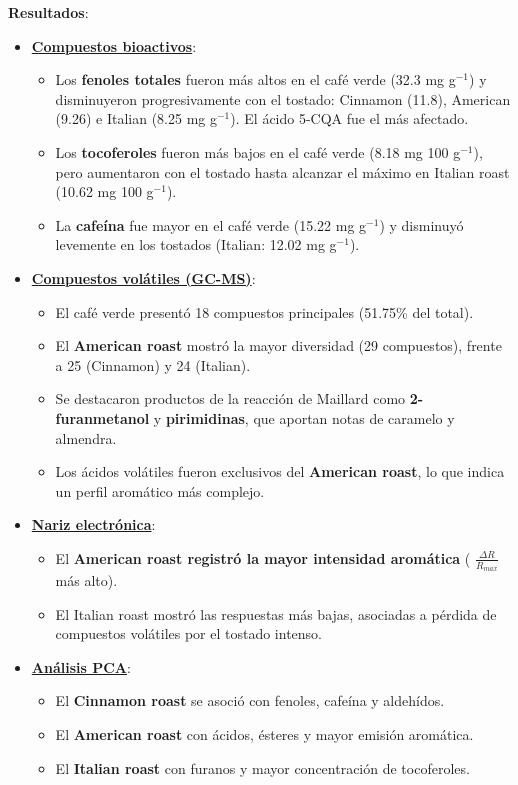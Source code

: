 \documentclass{article}
\begin{document}
\textbf{Resultados}:  
\begin{itemize}
	\item \underline{\textbf{Compuestos bioactivos}}: 
	\begin{itemize}
		\item Los \textbf{fenoles totales} fueron más altos en el café verde (32.3 mg g$^{-1}$) y disminuyeron progresivamente con el tostado: Cinnamon (11.8), American (9.26) e Italian (8.25 mg g$^{-1}$). El ácido 5-CQA fue el más afectado.  
		\item Los \textbf{tocoferoles} fueron más bajos en el café verde (8.18 mg 100 g$^{-1}$), pero aumentaron con el tostado hasta alcanzar el máximo en Italian roast (10.62 mg 100 g$^{-1}$).  
		\item La \textbf{cafeína} fue mayor en el café verde (15.22 mg g$^{-1}$) y disminuyó levemente en los tostados (Italian: 12.02 mg g$^{-1}$).  
	\end{itemize}
	\item \underline{\textbf{Compuestos volátiles (GC-MS)}}: 
	\begin{itemize}
		\item El café verde presentó 18 compuestos principales (51.75\% del total).  
		\item El \textbf{American roast} mostró la mayor diversidad (29 compuestos), frente a 25 (Cinnamon) y 24 (Italian).  
		\item Se destacaron productos de la reacción de Maillard como \textbf{2-furanmetanol} y \textbf{pirimidinas}, que aportan notas de caramelo y almendra.  
		\item Los ácidos volátiles fueron exclusivos del \textbf{American roast}, lo que indica un perfil aromático más complejo.  
	\end{itemize}
	\item \underline{\textbf{Nariz electrónica}}: 
	\begin{itemize}
		\item El \textbf{American roast registró la mayor intensidad aromática} ( $\frac{\Delta{R}}{R_{max}}$ más alto).  
		\item El Italian roast mostró las respuestas más bajas, asociadas a pérdida de compuestos volátiles por el tostado intenso.  
	\end{itemize}
	\item \underline{\textbf{Análisis PCA}}: 
	\begin{itemize}
		\item El \textbf{Cinnamon roast} se asoció con fenoles, cafeína y aldehídos.  
		\item El \textbf{American roast} con ácidos, ésteres y mayor emisión aromática.  
		\item El \textbf{Italian roast} con furanos y mayor concentración de tocoferoles.  
	\end{itemize}
\end{itemize} \vspace{0.5cm}
\end{document}
